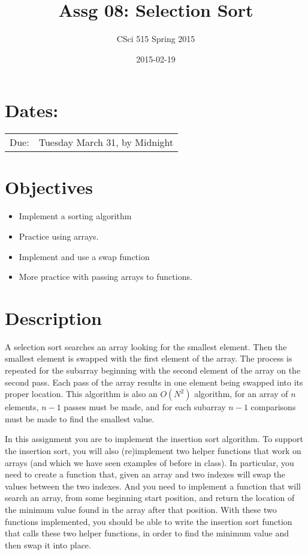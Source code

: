 \documentclass[11pt]{article}
\title{Assg 08: Selection Sort}
\author{CSci 515 Spring 2015}
\date{2015-02-19}
\begin{document}
\maketitle


\section*{Dates:}
\label{sec-1}


\begin{center}
\begin{tabular}{ll}
 Due:  &  Tuesday March 31, by Midnight  \\
\end{tabular}
\end{center}
\section*{Objectives}
\label{sec-2}

\begin{itemize}
\item Implement a sorting algorithm
\item Practice using arrays.
\item Implement and use a swap function
\item More practice with passing arrays to functions.
\end{itemize}
\section*{Description}
\label{sec-3}

A selection sort searches an array looking for the smallest element.
Then the smallest element is swapped with the first element of the
array.  The process is repeated for the subarray beginning with the
second element of the array on the second pass.  Each pass of the
array results in one element being swapped into its proper location.
This algorithm is also an $O(N^2)$ algorithm, for an array of $n$
elements, $n - 1$ passes must be made, and for each subarray $n - 1$
comparisons must be made to find the smallest value.

In this assignment you are to implement the insertion sort algorithm.
To support the insertion sort, you will also (re)implement two helper
functions that work on arrays (and which we have seen examples of
before in class).  In particular, you need to create a function that,
given an array and two indexes will swap the values between the two
indexes.  And you need to implement a function that will search an
array, from some beginning start position, and return the location of
the minimum value found in the array after that position.  With these
two functions implemented, you should be able to write the insertion
sort function that calls these two helper functions, in order to find
the minimum value and then swap it into place.
\end{document}
